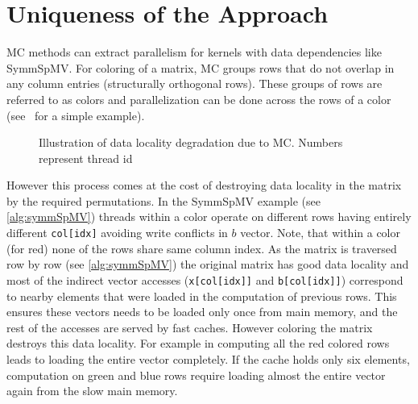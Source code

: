 \section{Uniqueness of the Approach} \label{sec:uniqueness}
\Acrlong{MC} methods can extract parallelism for kernels with data dependencies like \acrshort{SymmSpMV}. 
For \DTWO coloring of a matrix, \acrshort{MC}
groups rows that do not overlap in any column 
entries \cite{dist_k_def} (structurally orthogonal rows). These groups of rows are referred to as colors and parallelization can be done across the rows of a color (see~ for a simple example). 
\begin{figure}[tb]
	\centering
	\hspace{0.5em}
	\caption{\label{fig:mc_problem} Illustration of data locality degradation due to \acrshort{MC}.
		Numbers represent thread id}
\end{figure}
However this process comes at the cost of destroying data locality in the matrix by the required permutations. 
In the \acrshort{SymmSpMV} example (see \cref{alg:symmSpMV}) 
threads within a color operate on different rows having entirely different 
\texttt{col[idx]} avoiding write conflicts in $b$ vector. 
Note, that within a color (for \eg red) none of the rows share same column index.
As the matrix is traversed row by row (see \cref{alg:symmSpMV}) the original matrix
has good data locality and most of the indirect vector accesses 
(\texttt{x[col[idx]]} and \texttt{b[col[idx]]}) correspond to nearby elements 
that were loaded in the computation of previous rows.
This ensures these vectors needs to be loaded only
once from main memory, and the rest of the accesses are served by 
fast caches. However coloring the matrix destroys this data locality. For example
in  computing all the red colored rows leads to loading the 
entire vector completely. If the cache holds only  six elements, 
computation on green and blue rows require loading almost the entire vector again 
from the slow main memory.
